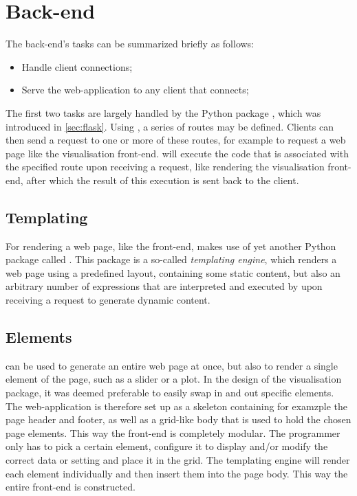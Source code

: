 \documentclass[a4paper, openany, oneside]{memoir}
\begin{document}
\section{Back-end}
\label{sec:webserver}
The back-end's tasks can be summarized briefly as follows:

\begin{itemize}
	\item Handle client connections;
	\item Serve the web-application to any client that connects;
\end{itemize}

The first two tasks are largely handled by the Python package , which was introduced in \cref{sec:flask}. Using , a series of routes may be defined. Clients can then send a request to one or more of these routes, for example to request a web page like the visualisation front-end.  will execute the code that is associated with the specified route upon receiving a request, like rendering the visualisation front-end, after which the result of this execution is sent back to the client.


\subsection{Templating}
\label{sec:templating}
For rendering a web page, like the front-end,  makes use of yet another Python package called . This package is a so-called \emph{templating engine}, which renders a web page using a predefined layout, containing some static content, but also an arbitrary number of expressions that are interpreted and executed by  upon receiving a request to generate dynamic content.

\subsection{Elements}
\label{sec:elements}
 can be used to generate an entire web page at once, but also to render a single element of the page, such as a slider or a plot. In the design of the visualisation package, it was deemed preferable to easily swap in and out specific elements. The web-application is therefore set up as a skeleton containing for examzple the page header and footer, as well as a grid-like body that is used to hold the chosen page elements. This way the front-end is completely modular. The programmer only has to pick a certain element, configure it to display and/or modify the correct data or setting and place it in the grid. The templating engine will render each element individually and then insert them into the page body. This way the entire front-end is constructed.
\end{document}
